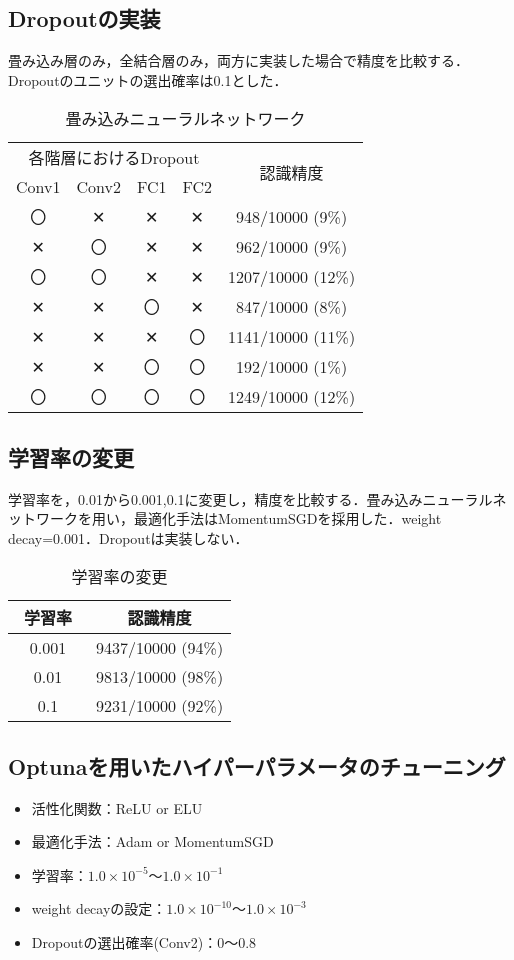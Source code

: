 \documentclass[a4paper, 12pt, dvipdfmx]{jarticle}
\begin{document}
\subsection{Dropoutの実装}
畳み込み層のみ，全結合層のみ，両方に実装した場合で精度を比較する．Dropoutのユニットの選出確率は0.1とした．
\begin{table}[htb]
  \centering
  \caption{畳み込みニューラルネットワーク}
  \begin{tabular}{cccc|c} \hline
    \multicolumn{4}{c}{各階層におけるDropout}　& \multirow{2}{*}{認識精度} \\
    Conv1 & Conv2 & FC1 & FC2 & \\ \hline
    〇 & ✕ & ✕ & ✕ & 948/10000 (9\%) \\
    ✕ & 〇 & ✕ & ✕ & 962/10000 (9\%) \\
    〇 & 〇 & ✕ & ✕ & 1207/10000 (12\%) \\
    ✕ & ✕ & 〇 & ✕ & 847/10000 (8\%) \\
    ✕ & ✕ & ✕ & 〇 &  1141/10000 (11\%) \\
    ✕ & ✕ & 〇 & 〇 &  192/10000 (1\%) \\
    〇 & 〇 & 〇 & 〇 & 1249/10000 (12\%)\\ \hline
  \end{tabular}
\end{table}

\subsection{学習率の変更}
学習率を，0.01から0.001,0.1に変更し，精度を比較する．畳み込みニューラルネットワークを用い，最適化手法はMomentumSGDを採用した．weight decay=0.001．Dropoutは実装しない．

\begin{table}[htb]
  \centering
  \caption{学習率の変更}
  \begin{tabular}{c|c} \hline
    学習率　& 認識精度 \\ \hline
    0.001 & 9437/10000 (94\%) \\
    0.01 & 9813/10000 (98\%) \\
    0.1 & 9231/10000 (92\%) \\ \hline
  \end{tabular}
\end{table}

\subsection{Optunaを用いたハイパーパラメータのチューニング}
\begin{itemize}
  \item 活性化関数：ReLU or ELU
  \item 最適化手法：Adam or MomentumSGD
  \item 学習率：$1.0\times 10^{-5}$～$1.0\times 10^{-1}$
  \item weight decayの設定：$1.0\times 10^{-10}$～$1.0\times 10^{-3}$
  \item Dropoutの選出確率(Conv2)：0～0.8
\end{itemize}
\end{document}
